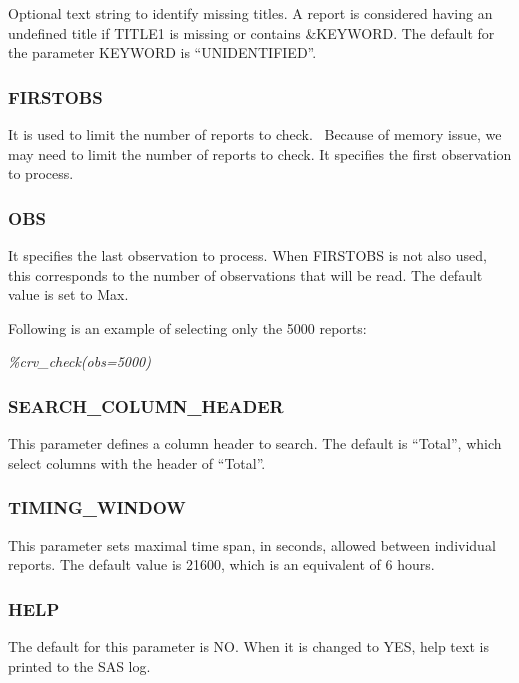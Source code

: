 \documentclass[
  letterpaper,
  DIV=11,
  numbers=noendperiod]{scrartcl}
\begin{document}
Optional text string to identify missing titles. A report is considered
having an undefined title if TITLE1 is missing or contains \&KEYWORD.
The default for the parameter KEYWORD is ``UNIDENTIFIED''.

\hypertarget{firstobs}{%
\subsubsection{FIRSTOBS}\label{firstobs}}

It is used to limit the number of reports to check.~ Because of memory
issue, we may need to limit the number of reports to check. It specifies
the first observation to process.

\hypertarget{obs}{%
\subsubsection{OBS}\label{obs}}

It specifies the last observation to process. When FIRSTOBS is not also
used, this corresponds to the number of observations that will be read.
The default value is set to Max.

Following is an example of selecting only the 5000 reports:

\emph{\%crv\_check(obs=5000)}

\hypertarget{search_column_header}{%
\subsubsection{SEARCH\_COLUMN\_HEADER}\label{search_column_header}}

This parameter defines a column header to search. The default is
``Total'', which select columns with the header of ``Total''.

\hypertarget{timing_window}{%
\subsubsection{TIMING\_WINDOW}\label{timing_window}}

This parameter sets maximal time span, in seconds, allowed between
individual reports. The default value is 21600, which is an equivalent
of 6 hours.

\hypertarget{help}{%
\subsubsection{HELP}\label{help}}

The default for this parameter is NO. When it is changed to YES, help
text is printed to the SAS log.
\end{document}

